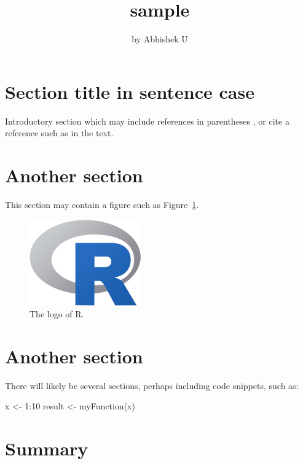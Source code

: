 
\title{ sample}

\author{by Abhishek U}

\maketitle


\section{Section title in sentence case}

Introductory section which may include references in parentheses
\citep{R}, or cite a reference such as \citet{R} in the text.

\section{Another section}

This section may contain a figure such as Figure~\ref{figure:rlogo}.

\begin{figure}[htbp]
  \centering
  \includegraphics{Rlogo-5}
  \caption{The logo of R.}
  \label{figure:rlogo}
\end{figure}

\section{Another section}

There will likely be several sections, perhaps including code snippets, such as:

\begin{example}
  x <- 1:10
  result <- myFunction(x)
\end{example}

\section{Summary}

